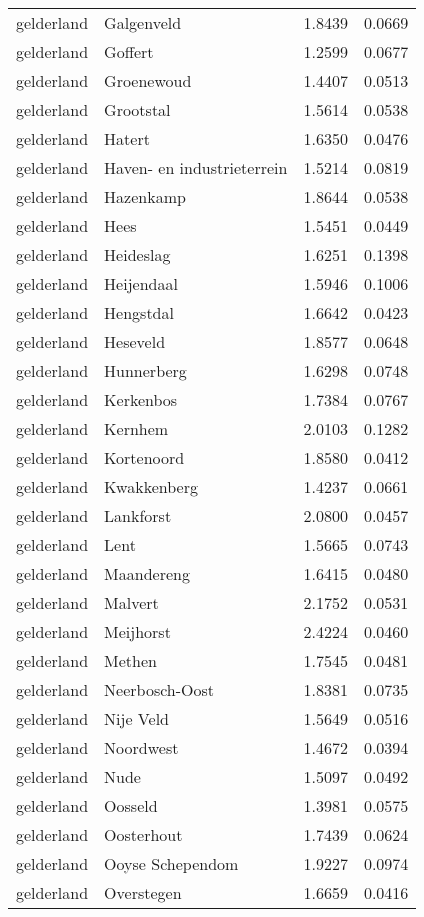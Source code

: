 \begin{longtable}{llcc}
gelderland & Galgenveld & 1.8439 & 0.0669 \\
gelderland & Goffert & 1.2599 & 0.0677 \\
gelderland & Groenewoud & 1.4407 & 0.0513 \\
gelderland & Grootstal & 1.5614 & 0.0538 \\
gelderland & Hatert & 1.6350 & 0.0476 \\
gelderland & Haven- en industrieterrein & 1.5214 & 0.0819 \\
gelderland & Hazenkamp & 1.8644 & 0.0538 \\
gelderland & Hees & 1.5451 & 0.0449 \\
gelderland & Heideslag & 1.6251 & 0.1398 \\
gelderland & Heijendaal & 1.5946 & 0.1006 \\
gelderland & Hengstdal & 1.6642 & 0.0423 \\
gelderland & Heseveld & 1.8577 & 0.0648 \\
gelderland & Hunnerberg & 1.6298 & 0.0748 \\
gelderland & Kerkenbos & 1.7384 & 0.0767 \\
gelderland & Kernhem & 2.0103 & 0.1282 \\
gelderland & Kortenoord & 1.8580 & 0.0412 \\
gelderland & Kwakkenberg & 1.4237 & 0.0661 \\
gelderland & Lankforst & 2.0800 & 0.0457 \\
gelderland & Lent & 1.5665 & 0.0743 \\
gelderland & Maandereng & 1.6415 & 0.0480 \\
gelderland & Malvert & 2.1752 & 0.0531 \\
gelderland & Meijhorst & 2.4224 & 0.0460 \\
gelderland & Methen & 1.7545 & 0.0481 \\
gelderland & Neerbosch-Oost & 1.8381 & 0.0735 \\
gelderland & Nije Veld & 1.5649 & 0.0516 \\
gelderland & Noordwest & 1.4672 & 0.0394 \\
gelderland & Nude & 1.5097 & 0.0492 \\
gelderland & Oosseld & 1.3981 & 0.0575 \\
gelderland & Oosterhout & 1.7439 & 0.0624 \\
gelderland & Ooyse Schependom & 1.9227 & 0.0974 \\
gelderland & Overstegen & 1.6659 & 0.0416 \\

\end{longtable}
